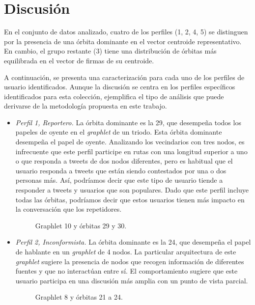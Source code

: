 \section{Discusión}
En el conjunto de datos analizado, cuatro de los perfiles (1, 2, 4, 5) se distinguen por la presencia de una órbita dominante en el vector centroide representativo. En cambio, el grupo restante (3) tiene una distribución de órbitas más equilibrada en el vector de firmas de su centroide.

A continuación, se presenta una caracterización para cada uno de los perfiles de usuario identificados. Aunque la discusión se centra en los perfiles específicos identificados para esta colección, ejemplifica el tipo de análisis que puede derivarse de la metodología propuesta en este trabajo.   

\begin{itemize} 
    
\item \emph{Perfil 1, Reportero.} La órbita dominante es la 29, que desempeña todos los papeles de oyente en el \textit{graphlet} de un triodo. Esta órbita dominante desempeña el papel de oyente. Analizando los vecindarios con tres nodos, es infrecuente que este perfil participe en rutas con una longitud superior a uno o que responda a tweets de dos nodos diferentes, pero es habitual que el usuario responda a tweets que están siendo contestados por una o dos personas más. Así, podríamos decir que este tipo de usuario tiende a responder a tweets y usuarios que son populares. Dado que este perfil incluye todas las órbitas, podríamos decir que estos usuarios tienen más impacto en la conversación que los repetidores. \begin{figure}[htbp]
   \centering
   
    \caption{Graphlet 10 y órbitas 29 y 30.}
    \label{img:web-comp}
\end{figure}

\item \emph{Perfil 2, Inconformista.} La órbita dominante es la 24, que desempeña el papel de hablante en un \textit{graphlet} de 4 nodos. La particular arquitectura de este \textit{graphlet} sugiere la presencia de nodos que recogen información de diferentes fuentes y que no interactúan entre sí. El comportamiento sugiere que este usuario participa en una discusión más amplia con un punto de vista parcial. \begin{figure}[htbp]
   \centering
   
    \caption{Graphlet 8 y órbitas 21 a 24.}
    \label{img:web-comp}
\end{figure}


\end{itemize}
